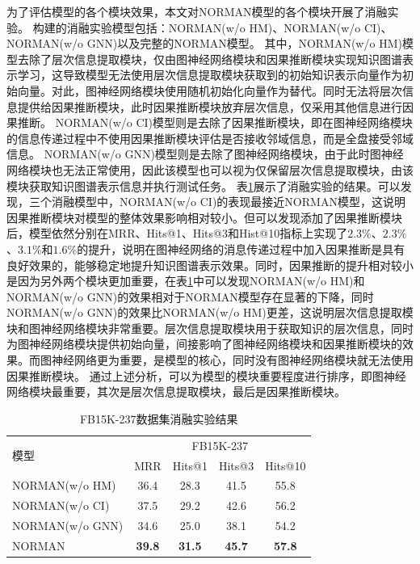 \documentclass[algorithmlist, AutoFakeBold, AutoFakeSlant, figurelist, tablelist, nomlist, engineering]{seuthesix}
\begin{document}
为了评估模型的各个模块效果，本文对NORMAN模型的各个模块开展了消融实验。
构建的消融实验模型包括：NORMAN(w/o HM)、NORMAN(w/o CI)、NORMAN(w/o GNN)以及完整的NORMAN模型。
其中，NORMAN(w/o HM)模型去除了层次信息提取模块，仅由图神经网络模块和因果推断模块实现知识图谱表示学习，这导致模型无法使用层次信息提取模块获取到的初始知识表示向量作为初始向量。对此，图神经网络模块使用随机初始化向量作为替代。同时无法将层次信息提供给因果推断模块，此时因果推断模块放弃层次信息，仅采用其他信息进行因果推断。
NORMAN(w/o CI)模型则是去除了因果推断模块，即在图神经网络模块的信息传递过程中不使用因果推断模块评估是否接收邻域信息，而是全盘接受邻域信息。
NORMAN(w/o GNN)模型则是去除了图神经网络模块，由于此时图神经网络模块也无法正常使用，因此该模型也可以视为仅保留层次信息提取模块，由该模块获取知识图谱表示信息并执行测试任务。
表\ref{Experiment1_ablation}展示了消融实验的结果。可以发现，三个消融模型中，NORMAN(w/o CI)的表现最接近NORMAN模型，这说明因果推断模块对模型的整体效果影响相对较小。但可以发现添加了因果推断模块后，模型依然分别在MRR、Hits@1、Hits@3和Hist@10指标上实现了$2.3\%$、$2.3\%$、$3.1\%$和$1.6\%$的提升，说明在图神经网络的消息传递过程中加入因果推断是具有良好效果的，能够稳定地提升知识图谱表示效果。同时，因果推断的提升相对较小是因为另外两个模块更加重要，在表\ref{Experiment1_ablation}中可以发现NORMAN(w/o HM)和NORMAN(w/o GNN)的效果相对于NORMAN模型存在显著的下降，同时NORMAN(w/o GNN)的效果比NORMAN(w/o HM)更差，这说明层次信息提取模块和图神经网络模块非常重要。层次信息提取模块用于获取知识的层次信息，同时为图神经网络模块提供初始向量，间接影响了图神经网络模块和因果推断模块的效果。而图神经网络更为重要，是模型的核心，同时没有图神经网络模块就无法使用因果推断模块。
通过上述分析，可以为模型的模块重要程度进行排序，即图神经网络模块最重要，其次是层次信息提取模块，最后是因果推断模块。
\begin{table}[]
  \centering
  \begin{tabular*}{0.95\textwidth}{@{\extracolsep{\fill}}lcccc}
  \toprule[1pt]
  \multirow{2}{*}{模型} & \multicolumn{4}{c}{FB15K-237} \\
    & MRR & Hits@1 & Hits@3 & Hits@10 \\ \hline
  NORMAN(w/o HM) & 36.4 & 28.3 & 41.5 & 55.8 \\
  NORMAN(w/o CI) & 37.5 & 29.2 & 42.6 & 56.2 \\
  NORMAN(w/o GNN) & 34.6 & 25.0 & 38.1 & 54.2 \\
  NORMAN & \textbf{39.8} & \textbf{31.5} & \textbf{45.7} & \textbf{57.8} \\
  \bottomrule[1pt]
  \end{tabular*}
  \caption{FB15K-237数据集消融实验结果}
  \label{Experiment1_ablation}
\end{table}
\end{document}
